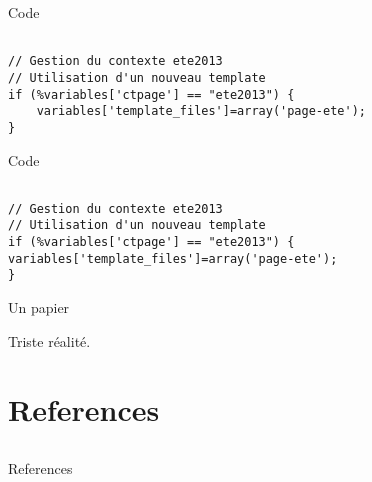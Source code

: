 \documentclass[11pt]{beamer}
\begin{document}
\begin{frame}[fragile]{Code}
\begin{lstlisting}

// Gestion du contexte ete2013
// Utilisation d'un nouveau template
if (%variables['ctpage'] == "ete2013") {
    variables['template_files']=array('page-ete');
}
\end{lstlisting}
\end{frame}

\begin{frame}[fragile]{Code}
\begin{verbatim}

// Gestion du contexte ete2013
// Utilisation d'un nouveau template
if (%variables['ctpage'] == "ete2013") {
variables['template_files']=array('page-ete');
}
\end{verbatim}
\end{frame}

\begin{frame}{Un papier}

\begin{alertblock}{ \cite{Ioannidis_2005}}

Triste réalité.	
	
\end{alertblock}

\end{frame}

\section{References} \subsection{}

\begin{frame}[allowframebreaks]{References}

\printbibliography[heading=none]

\end{frame}

\end{document}
